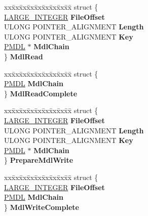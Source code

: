 \begin{DoxyCompactItemize}
\begin{tabbing}
\end{tabbing}\item 
\mbox{\label{union___f_l_t___p_a_r_a_m_e_t_e_r_s_a93bae0e077b47d7254212b11a35386a2}} 
\begin{tabbing}
xx\=xx\=xx\=xx\=xx\=xx\=xx\=xx\=xx\=\kill
struct \{\\
\>\hyperlink{union___l_a_r_g_e___i_n_t_e_g_e_r}{LARGE\_INTEGER} {\bfseries FileOffset}\\
\>ULONG POINTER\_ALIGNMENT {\bfseries Length}\\
\>ULONG POINTER\_ALIGNMENT {\bfseries Key}\\
\>\hyperlink{interfacevoid}{PMDL} $\ast$ {\bfseries MdlChain}\\
\} {\bfseries MdlRead}\\

\end{tabbing}\item 
\mbox{\label{union___f_l_t___p_a_r_a_m_e_t_e_r_s_afd79e56b2d48dd914578c6996970f6ea}} 
\begin{tabbing}
xx\=xx\=xx\=xx\=xx\=xx\=xx\=xx\=xx\=\kill
struct \{\\
\>\hyperlink{interfacevoid}{PMDL} {\bfseries MdlChain}\\
\} {\bfseries MdlReadComplete}\\

\end{tabbing}\item 
\mbox{\label{union___f_l_t___p_a_r_a_m_e_t_e_r_s_a48c14838dcb305b6a8ac5901a3314782}} 
\begin{tabbing}
xx\=xx\=xx\=xx\=xx\=xx\=xx\=xx\=xx\=\kill
struct \{\\
\>\hyperlink{union___l_a_r_g_e___i_n_t_e_g_e_r}{LARGE\_INTEGER} {\bfseries FileOffset}\\
\>ULONG POINTER\_ALIGNMENT {\bfseries Length}\\
\>ULONG POINTER\_ALIGNMENT {\bfseries Key}\\
\>\hyperlink{interfacevoid}{PMDL} $\ast$ {\bfseries MdlChain}\\
\} {\bfseries PrepareMdlWrite}\\

\end{tabbing}\item 
\mbox{\label{union___f_l_t___p_a_r_a_m_e_t_e_r_s_ac92d38ebba9c1518bd5cb18da1195a06}} 
\begin{tabbing}
xx\=xx\=xx\=xx\=xx\=xx\=xx\=xx\=xx\=\kill
struct \{\\
\>\hyperlink{union___l_a_r_g_e___i_n_t_e_g_e_r}{LARGE\_INTEGER} {\bfseries FileOffset}\\
\>\hyperlink{interfacevoid}{PMDL} {\bfseries MdlChain}\\
\} {\bfseries MdlWriteComplete}\\


\end{tabbing}
\end{DoxyCompactItemize}
